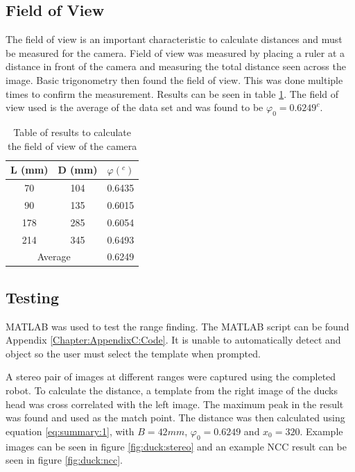 \subsection{Field of View}
The field of view is an important characteristic to calculate distances and must be measured for the camera. Field of view was measured by placing a ruler at a distance in front of the camera and measuring the total distance seen across the image. Basic trigonometry then found the field of view. This was done multiple times to confirm the measurement. Results can be seen in table \ref{table:fieldofview}. The field of view used is the average of the data set and was found to be $\varphi_0 = 0.6249^c$. 
\begin{table}
\caption{Table of results to calculate the field of view of the camera}
\label{table:fieldofview}
\centering
\begin{tabular}{|c|c|c|} \hline
L (mm) & D (mm) & $\varphi (^c)$ \\ \hline
70 & 104 & 0.6435\\
90 & 135 &0.6015\\
178 & 285 &0.6054\\
214 & 345 &0.6493 \\ \hline
\multicolumn{2}{|c|}{Average} & 0.6249 \\ \hline
\end{tabular}

\end{table}



\subsection{Testing}
MATLAB was used to test the range finding. The MATLAB script can be found Appendix \ref{Chapter:AppendixC:Code}. It is unable to automatically detect and object so the user must select the template when prompted. 

A stereo pair of images at different ranges were captured using the completed robot. To calculate the distance, a template from the right image of the ducks head was cross correlated with the left image. The maximum peak in the result was found and used as the match point. The distance was then calculated using equation \eqref{eq:summary:1}, with $B=42mm$, $\varphi_0=0.6249$ and $x_0=320$. Example images can be seen in figure \ref{fig:duck:stereo} and an example NCC result can be seen in figure \ref{fig:duck:ncc}. 

